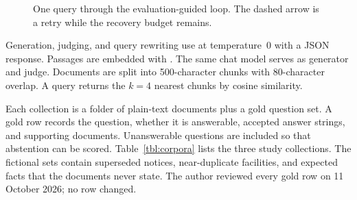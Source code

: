 \documentclass[12pt, a4paper, oneside]{report}
\newcommand{\code}[1]{\texttt{\detokenize{#1}}}
\begin{document}
\begin{figure}[htbp]
\centering
{}
\caption{One query through the evaluation-guided loop. The dashed arrow is
a retry while the recovery budget remains.}
\label{fig:loop}
\end{figure}

Generation, judging, and query rewriting use \code{gpt-4o-mini} at
temperature~0 with a JSON response. Passages are embedded with
\code{text-embedding-3-small}. The same chat model serves as generator and
judge. Documents are split into 500-character chunks with 80-character
overlap. A query returns the $k=4$ nearest chunks by cosine similarity.

Each collection is a folder of plain-text documents plus a gold question
set. A gold row records the question, whether it is answerable, accepted
answer strings, and supporting documents. Unanswerable questions are
included so that abstention can be scored. Table~\ref{tbl:corpora} lists
the three study collections. The fictional sets contain superseded
notices, near-duplicate facilities, and expected facts that the documents
never state. The author reviewed every gold row on 11 October 2026; no
row changed.
\end{document}
